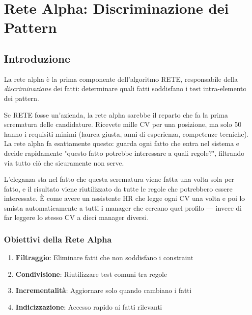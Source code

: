 
\chapter{Rete Alpha: Discriminazione dei Pattern}
\label{cap:rete_alpha}

\section{Introduzione}

La rete alpha è la prima componente dell'algoritmo RETE, responsabile della \textit{discriminazione} dei fatti: determinare quali fatti soddisfano i test intra-elemento dei pattern.

Se RETE fosse un'azienda, la rete alpha sarebbe il reparto che fa la prima scrematura delle candidature. Ricevete mille CV per una posizione, ma solo 50 hanno i requisiti minimi (laurea giusta, anni di esperienza, competenze tecniche). La rete alpha fa esattamente questo: guarda ogni fatto che entra nel sistema e decide rapidamente "questo fatto potrebbe interessare a quali regole?", filtrando via tutto ciò che sicuramente non serve.

L'eleganza sta nel fatto che questa scrematura viene fatta una volta sola per fatto, e il risultato viene riutilizzato da tutte le regole che potrebbero essere interessate. È come avere un assistente HR che legge ogni CV una volta e poi lo smista automaticamente a tutti i manager che cercano quel profilo — invece di far leggere lo stesso CV a dieci manager diversi.

\subsection{Obiettivi della Rete Alpha}

\begin{infobox}
\begin{enumerate}
\item \textbf{Filtraggio}: Eliminare fatti che non soddisfano i constraint
\item \textbf{Condivisione}: Riutilizzare test comuni tra regole
\item \textbf{Incrementalità}: Aggiornare solo quando cambiano i fatti
\item \textbf{Indicizzazione}: Accesso rapido ai fatti rilevanti
\end{enumerate}
\end{infobox}

